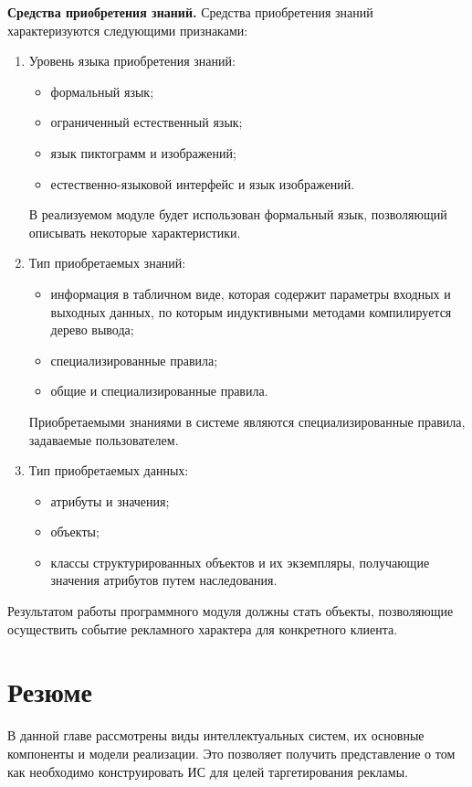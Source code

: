 \textbf{Средства приобретения знаний.} Средства приобретения знаний характеризуются следующими признаками:

\begin{enumerate}

\item Уровень языка приобретения знаний:
\begin{itemize}
\item формальный язык;
\item ограниченный естественный язык;
\item язык пиктограмм и изображений;
\item естественно-языковой интерфейс и язык изображений. 
\end{itemize}

В реализуемом модуле будет использован формальный язык, позволяющий описывать некоторые характеристики.

\item Тип приобретаемых знаний:
\begin{itemize}
\item информация в табличном виде, которая содержит параметры входных и выходных данных, по которым индуктивными методами компилируется дерево вывода;
\item специализированные правила;
\item общие и специализированные правила.
\end{itemize}

Приобретаемыми знаниями в системе являются специализированные правила, задаваемые пользователем.

\item Тип приобретаемых данных:
\begin{itemize}
\item атрибуты и значения;
\item объекты;
\item классы структурированных объектов и их экземпляры, получающие значения атрибутов путем наследования.  
\end{itemize}

\end{enumerate}

Результатом работы программного модуля должны стать объекты, позволяющие осуществить событие рекламного характера для конкретного клиента.

\section{Резюме}

В данной главе рассмотрены виды интеллектуальных систем, их основные компоненты и модели реализации. Это позволяет получить представление о том как необходимо конструировать ИС для целей таргетирования рекламы.